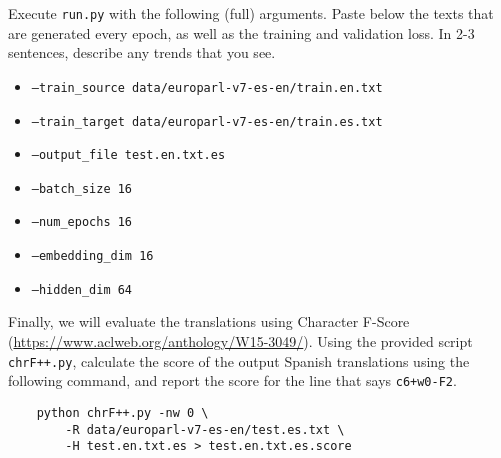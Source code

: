 \documentclass[11pt]{article}
\begin{document}
\vspace{2em}
  Execute \texttt{run.py} with the following (full) arguments. Paste below the texts that are generated every epoch, as well as the training and validation loss. In 2-3 sentences, describe any trends that you see.
\begin{itemize}
    \item \texttt{--train\_source data/europarl-v7-es-en/train.en.txt}
    \item \texttt{--train\_target data/europarl-v7-es-en/train.es.txt}
    \item \texttt{--output\_file test.en.txt.es}
    \item \texttt{--batch\_size 16}
    \item \texttt{--num\_epochs 16}
    \item \texttt{--embedding\_dim 16}
    \item \texttt{--hidden\_dim 64}
\end{itemize}

\vspace{2em}
 Finally, we will evaluate the translations using Character F-Score (\url{https://www.aclweb.org/anthology/W15-3049/}). Using the provided script \texttt{chrF++.py}, calculate the score of the output Spanish translations using the following command, and report the score for the line that says \texttt{c6+w0-F2}.
\begin{lstlisting}
    python chrF++.py -nw 0 \ 
        -R data/europarl-v7-es-en/test.es.txt \
        -H test.en.txt.es > test.en.txt.es.score
\end{lstlisting}
\end{document}
